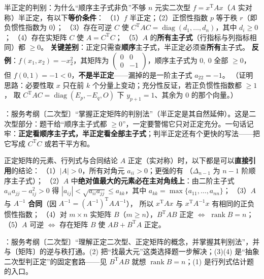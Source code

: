 \begin{fdeep}{半正定的判别：为什么“顺序主子式非负”不够}
$n$ 元实二次型 $f=x^{\mathrm T}Ax$（$A$ 实对称）半正定，有以下\textbf{等价条件}：
（1）$f$ 半正定；（2）正惯性指数 $p$ 等于秩 $r$（即负惯性指数为 $0$）；
（3）存在可逆 $C$ 使 $C^{\mathrm T}AC=\operatorname{diag}(d_1,\dots,d_n)$，其中 $d_i\ge0$；
（4）存在实矩阵 $C$ 使 $A=C^{\mathrm T}C$；
（5）$A$ 的\textbf{所有主子式}（行指标与列指标相同）都 $\ge0$。
\textbf{关键差别}：正定只需查\textbf{顺序}主子式，半正定必须查\textbf{所有}主子式。
\textbf{反例}：$f(x_1,x_2)=-x_2^{2}$，其矩阵为
$\begin{pmatrix}0&0\\0&-1\end{pmatrix}$，顺序主子式为 $0,\ 0$ 全部 $\ge0$，
但 $f(0,1)=-1<0$，\textbf{不是半正定}——漏掉的是一阶主子式 $a_{22}=-1$。
（证明思路：必要性取 $x$ 只在前 $k$ 个分量上变动；充分性反证，若正负惯性指数都 $\ge1$，
取 $C^{\mathrm T}AC=\operatorname{diag}(E_p,-E_q,O)$ 下 $y_{p+1}=1$、其余为 $0$ 的那个向量。）

\fbref{}：服务考纲〔二次型〕“掌握正定矩阵的判别法”（半正定是其自然延伸）。这是二次型部分：题干给“顺序主子式都 $\ge0$”，一定要警惕它只对正定充分。一句话记牢：\textbf{正定看顺序主子式，半正定看全部主子式}；判半正定还有个更快的写法——把它写成 $C^{\mathrm T}C$ 或若干平方和。
\end{fdeep}

\begin{fdeep}{正定矩阵的元素、行列式与合同结论}
$A$ 正定（实对称）时，以下都是可以\textbf{直接引用}的结论：
（1）$|A|>0$，所有对角元 $a_{ii}>0$；更强的有
（$\Delta_{n-1}$ 为 $n-1$ 阶顺序主子式）；
（2）$A$ 中\textbf{绝对值最大的元素必在主对角线上}：由二阶主子式 $a_{ii}a_{jj}-a_{ij}^{2}>0$
得 $|a_{ij}|<\sqrt{a_{ii}a_{jj}}\le a_{kk}$，其中 $a_{kk}=\max\{a_{11},\dots,a_{nn}\}$；
（3）$A$ 与 $A^{-1}$ \textbf{合同}（因 $A^{-1}=(A^{-1})^{\mathrm T}AA^{-1}$），
所以 $x^{\mathrm T}Ax$ 与 $x^{\mathrm T}A^{-1}x$ 有相同的正负惯性指数；
（4）对 $m\times n$ 实矩阵 $B$（$m\ge n$），$B^{\mathrm T}AB$ 正定 $\iff$ $\operatorname{rank}B=n$；
（5）$A$ 可逆 $\iff$ 存在矩阵 $B$ 使 $AB+B^{\mathrm T}A$ 正定。

\fbref{}：服务考纲〔二次型〕“理解正定二次型、正定矩阵的概念，并掌握其判别法”，并与〔矩阵〕的逆与秩打通。(2) 把“找最大元”这类选择题一步解决；(3)(4) 是“抽象二次型判正定”的固定套路——见 $B^{\mathrm T}AB$ 就想 $\operatorname{rank}B=n$；(1) 是行列式估计题的入口。
\end{fdeep}

